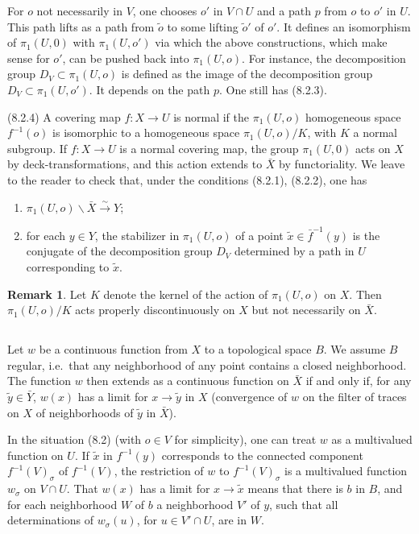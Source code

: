 \documentclass[12pt,a4paper]{article}
\theoremstyle{plain}
\theoremstyle{definition}
\newtheorem{remark}[theorem]{Remark}
\theoremstyle{remark}
\numberwithin{equation}{section}
\begin{document}
For $o$ not necessarily in $V$, one chooses $o'$ in $V \cap U$ and a path $p$ from $o$ to $o'$ in $U$. This path lifts as a path from $\tilde{o}$ to some lifting $\tilde{o}'$ of $o'$. It defines an isomorphism of $\pi_1(U, 0)$ with $\pi_1(U, o')$ via which the above constructions, which make sense for $o'$, can be pushed back into $\pi_1(U, o)$. For instance, the decomposition group $D_V \subset \pi_1(U, o)$ is defined as the image of the decomposition group $D_V \subset \pi_1(U, o')$. It depends on the path $p$. One still has (8.2.3).

(8.2.4) A covering map $f: X \to U$ is normal if the $\pi_1(U, o)$ homogeneous space $f^{-1}(o)$ is isomorphic to a homogeneous space $\pi_1(U, o)/K$, with $K$ a normal subgroup. If $f: X \to U$ is a normal covering map, the group $\pi_1(U, 0)$ acts on $X$ by deck-transformations, and this action extends to $\bar{X}$ by functoriality. We leave to the reader to check that, under the conditions (8.2.1), (8.2.2), one has
\begin{enumerate}
\item $\pi_1(U, o) \backslash \bar{X} \xrightarrow{\sim} Y$;
\item for each $y \in Y$, the stabilizer in $\pi_1(U, o)$ of a point $\tilde{x} \in \bar{f}^{-1}(y)$ is the conjugate of the decomposition group $D_V$ determined by a path in $U$ corresponding to $\tilde{x}$.
\end{enumerate}

\begin{remark}
Let $K$ denote the kernel of the action of $\pi_1(U, o)$ on $X$. Then $\pi_1(U, o)/K$ acts properly discontinuously on $X$ but not necessarily on $\bar{X}$.
\end{remark}

\subsection{}
Let $w$ be a continuous function from $X$ to a topological space $B$. We assume $B$ regular, i.e.\ that any neighborhood of any point contains a closed neighborhood. The function $w$ then extends as a continuous function on $\bar{X}$ if and only if, for any $\tilde{y} \in \bar{Y}$, $w(x)$ has a limit for $x \to \tilde{y}$ in $X$ (convergence of $w$ on the filter of traces on $X$ of neighborhoods of $\tilde{y}$ in $\bar{X}$).

In the situation (8.2) (with $o \in V$ for simplicity), one can treat $w$ as a multivalued function on $U$. If $\tilde{x}$ in $f^{-1}(y)$ corresponds to the connected component $f^{-1}(V)_\sigma$ of $f^{-1}(V)$, the restriction of $w$ to $f^{-1}(V)_\sigma$ is a multivalued function $w_\sigma$ on $V \cap U$. That $w(x)$ has a limit for $x \to \tilde{x}$ means that there is $b$ in $B$, and for each neighborhood $W$ of $b$ a neighborhood $V'$ of $y$, such that all determinations of $w_\sigma(u)$, for $u \in V' \cap U$, are in $W$.
\end{document}

